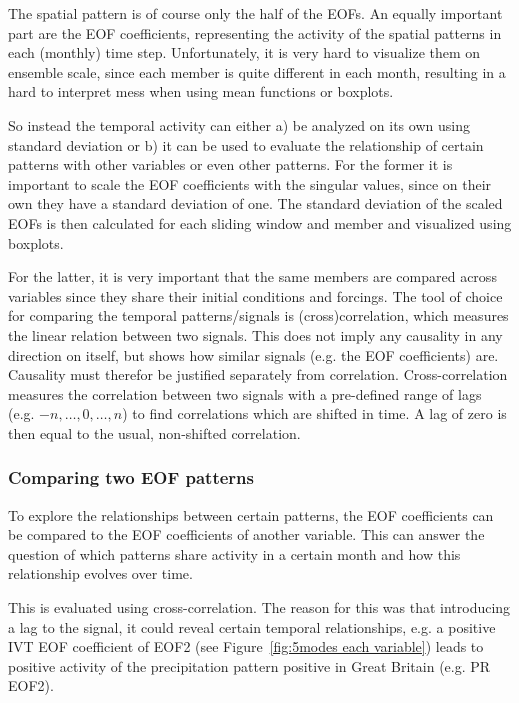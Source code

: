 The spatial pattern is of course only the half of the EOFs. 
An equally important part are the EOF coefficients, representing the activity of the spatial patterns in each (monthly) time step. 
Unfortunately, it is very hard to visualize them on ensemble scale, since each member is quite different in each month, resulting in a hard to interpret mess when using mean functions or boxplots. 

So instead the temporal activity can either a) be analyzed on its own using standard deviation or b) it can be used to evaluate the relationship of certain patterns with other variables or even other patterns. 
For the former it is important to scale the EOF coefficients with the singular values, since on their own they have a standard deviation of one. 
The standard deviation of the scaled EOFs is then calculated for each sliding window and member and visualized using boxplots. 

For the latter, it is very important that the same members are compared across variables since they share their initial conditions and forcings.  
The tool of choice for comparing the temporal patterns/signals is (cross)correlation, which measures the linear relation between two signals. 
This does not imply any causality in any direction on itself, but shows how similar signals (e.g. the EOF coefficients) are. 
Causality must therefor be justified separately from correlation.  
Cross-correlation measures the correlation between two signals with a pre-defined range of lags (e.g. $-n,\dots,0,\dots,n$) to find correlations which are shifted in time. 
A lag of zero is then equal to the usual, non-shifted correlation. 

\subsubsection{Comparing two EOF patterns}

To explore the relationships between certain patterns, the EOF coefficients can be compared to the EOF coefficients of another variable. 
This can answer the question of which patterns share activity in a certain month and how this relationship evolves over time. 

This is evaluated using cross-correlation. 
The reason for this was that introducing a lag to the signal, it could reveal certain temporal relationships, e.g. a positive IVT EOF coefficient of EOF2 (see Figure~\ref{fig:5modes each variable}) leads to positive activity of the precipitation pattern positive in Great Britain (e.g. PR EOF2). 


